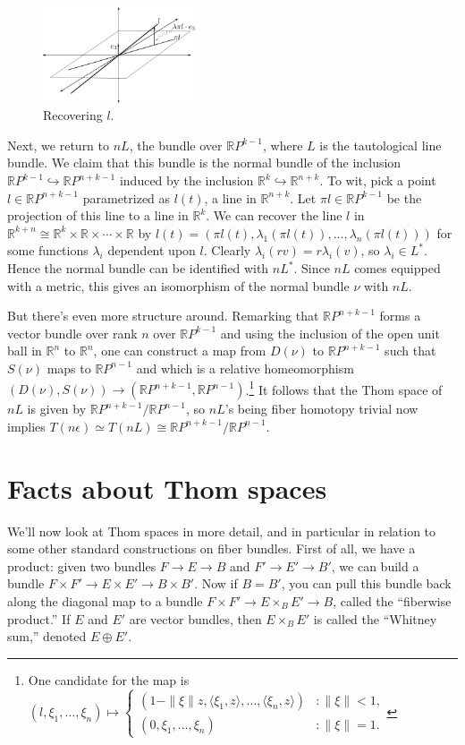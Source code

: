 \documentclass{article}
\newcommand{\OutputFactsAboutThomSpaces}{}
\newcommand{\R}{\mathbb{R}}
\newcommand{\RP}{\R P}
\newcommand{\into}{\hookrightarrow}
\begin{document}
\begin{figure}
\centering\includegraphics[width=0.4\textwidth]{figures/fig8.pdf}
\caption{\small Recovering $l$.}
\end{figure} %
Next, we return to $nL$, the bundle over $\RP^{k-1}$, where $L$ is the tautological line bundle.  We claim that this bundle is the normal bundle of the inclusion $\RP^{k-1} \into \RP^{n+k-1}$ induced by the inclusion $\R^k \into \R^{n+k}$.  To wit, pick a point $l \in \RP^{n+k-1}$ parametrized as $l(t)$, a line in $\R^{n+k}$.  Let $\pi l \in \RP^{k-1}$ be the projection of this line to a line in $\R^k$.  We can recover the line $l$ in $\R^{k+n} \cong \R^k \times \R \times \cdots \times \R$ by $l(t) = (\pi l(t), \lambda_1(\pi l(t)), \ldots, \lambda_n(\pi l(t)))$ for some functions $\lambda_i$ dependent upon $l$.  Clearly $\lambda_i(rv) = r \lambda_i(v)$, so $\lambda_i \in L^*$.  Hence the normal bundle can be identified with $nL^*$.  Since $nL$ comes equipped with a metric, this gives an isomorphism of the normal bundle $\nu$ with $nL$.

But there's even more structure around.  Remarking that $\RP^{n+k-1}$ forms a vector bundle over rank $n$ over $\RP^{k-1}$ and using the inclusion of the open unit ball in $\R^n$ to $\R^n$, one can construct a map from $D(\nu)$ to $\RP^{n+k-1}$ such that $S(\nu)$ maps to $\RP^{n-1}$ and which is a relative homeomorphism $(D(\nu), S(\nu)) \to (\RP^{n+k-1}, \RP^{n-1})$.\footnote{One candidate for the map is $(l, \xi_1, \ldots, \xi_n) \mapsto \begin{cases}(1 - \|\xi\|z, \langle \xi_1, z\rangle, \ldots, \langle \xi_n, z\rangle) & : \| \xi \| < 1, \\ (0, \xi_1, \ldots, \xi_n) & : \|\xi\| = 1. \end{cases}$}  It follows that the Thom space of $nL$ is given by $\RP^{n+k-1}/\RP^{n-1}$, so $nL$'s being fiber homotopy trivial now implies $T(n\epsilon) \simeq T(nL) \cong \RP^{n+k-1}/\RP^{n-1}$.

\fi
\section{Facts about Thom spaces} %
\ifx\OutputFactsAboutThomSpaces\undefined\else
We'll now look at Thom spaces in more detail, and in particular in relation to some other standard constructions on fiber bundles.  First of all, we have a product: given two bundles $F \to E \to B$ and $F' \to E' \to B'$, we can build a bundle $F \times F' \to E \times E' \to B \times B'$.  Now if $B = B'$, you can pull this bundle back along the diagonal map to a bundle $F \times F' \to E \times_B E' \to B$, called the ``fiberwise product.''  If $E$ and $E'$ are vector bundles, then $E \times_B E'$ is called the ``Whitney sum,'' denoted $E \oplus E'$.
\end{document}

